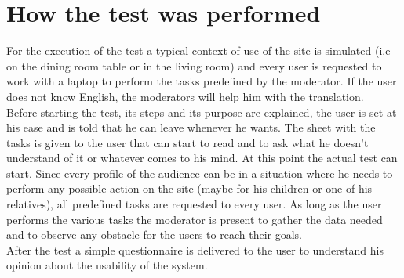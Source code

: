 \section{How the test was performed}
For the execution of the test a typical context of use of the site is simulated (i.e on the dining room table or in the living room) and every user is requested to work with a laptop to perform the tasks predefined by the moderator.
If the user does not know English, the moderators will help him with the translation.\\
Before starting the test, its steps and its purpose are explained, the user is set at his ease and is told that he can leave whenever he wants.
The sheet with the tasks is given to the user that can start to read and to ask what he doesn't understand of it or whatever comes to his mind. At this point the actual test can start. Since every profile of the audience can be in a situation where he needs to perform any possible action on the site (maybe for his children or one of his relatives), all predefined tasks are requested to every user. As long as the user performs the various tasks the moderator is present to gather the data needed and to observe any obstacle for the users to reach their goals.\\
After the test a simple questionnaire is delivered to the user to understand his opinion about the usability of the system.

%
%
